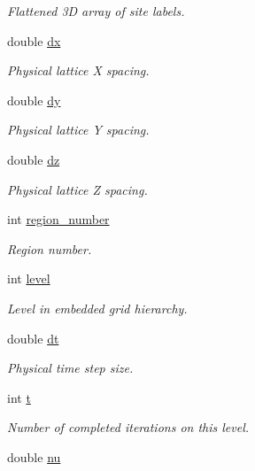 \begin{DoxyCompactItemize}
\begin{DoxyCompactList}\small\item\em Flattened 3D array of site labels. \end{DoxyCompactList}\item 
double \hyperlink{class_grid_obj_adbd4b9afbd8cf7bb2ccb48e7c5150f6d}{dx}
\begin{DoxyCompactList}\small\item\em Physical lattice X spacing. \end{DoxyCompactList}\item 
double \hyperlink{class_grid_obj_a62b3a2ed35439f36591740d762f6e7a1}{dy}
\begin{DoxyCompactList}\small\item\em Physical lattice Y spacing. \end{DoxyCompactList}\item 
double \hyperlink{class_grid_obj_a94a497f1cd79b35741843fcd3817c18f}{dz}
\begin{DoxyCompactList}\small\item\em Physical lattice Z spacing. \end{DoxyCompactList}\item 
int \hyperlink{class_grid_obj_ae0b724f2d977cfe38df2bb191e2fb042}{region\+\_\+number}
\begin{DoxyCompactList}\small\item\em Region number. \end{DoxyCompactList}\item 
int \hyperlink{class_grid_obj_a7dfedc4442a386ec15c8b03ca899c1a9}{level}
\begin{DoxyCompactList}\small\item\em Level in embedded grid hierarchy. \end{DoxyCompactList}\item 
double \hyperlink{class_grid_obj_afd504b39f12eb0a237bc6313de94e094}{dt}
\begin{DoxyCompactList}\small\item\em Physical time step size. \end{DoxyCompactList}\item 
int \hyperlink{class_grid_obj_a783b18a053e244ae7b7b436ab21c0592}{t}
\begin{DoxyCompactList}\small\item\em Number of completed iterations on this level. \end{DoxyCompactList}\item 
double \hyperlink{class_grid_obj_a755f85eb5480d959211e00937a478ae9}{nu}

\end{DoxyCompactItemize}
